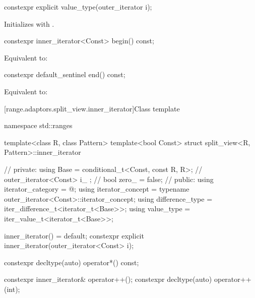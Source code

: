 \begin{addedblock}
%
\begin{itemdecl}
constexpr explicit value_type(outer_iterator i);
\end{itemdecl}

\begin{itemdescr}
\pnum
\effects Initializes  with .
\end{itemdescr}

%
\begin{itemdecl}
constexpr inner_iterator<Const> begin() const;
\end{itemdecl}

\begin{itemdescr}
\pnum
\effects Equivalent to: 
\end{itemdescr}

%
\begin{itemdecl}
constexpr default_sentinel end() const;
\end{itemdecl}

\begin{itemdescr}
\pnum
\effects Equivalent to: 
\end{itemdescr}

[range.adaptors.split_view.inner_iterator]{Class template }

\begin{codeblock}
namespace std::ranges {
  template<class R, class Pattern>
  template<bool Const>
  struct split_view<R, Pattern>::inner_iterator { // \expos
  private:
    using Base =
      conditional_t<Const, const R, R>; // \expos
    outer_iterator<Const> i_ {};        // \expos
    bool zero_ = false;                 // \expos
  public:
    using iterator_category = @\seebelownc@;
    using iterator_concept  = typename outer_iterator<Const>::iterator_concept;
    using difference_type   = iter_difference_t<iterator_t<Base>>;
    using value_type        = iter_value_t<iterator_t<Base>>;

    inner_iterator() = default;
    constexpr explicit inner_iterator(outer_iterator<Const> i);

    constexpr decltype(auto) operator*() const;

    constexpr inner_iterator& operator++();
    constexpr decltype(auto) operator++(int);

}}
\end{codeblock}
\end{addedblock}
